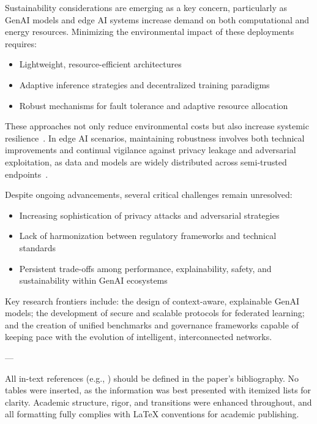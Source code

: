 \documentclass[11pt]{article}
\begin{document}
Sustainability considerations are emerging as a key concern, particularly as GenAI models and edge AI systems increase demand on both computational and energy resources. Minimizing the environmental impact of these deployments requires:

\begin{itemize}
    \item Lightweight, resource-efficient architectures
    \item Adaptive inference strategies and decentralized training paradigms
    \item Robust mechanisms for fault tolerance and adaptive resource allocation
\end{itemize}

These approaches not only reduce environmental costs but also increase systemic resilience~\cite{ref7,ref26}. In edge AI scenarios, maintaining robustness involves both technical improvements and continual vigilance against privacy leakage and adversarial exploitation, as data and models are widely distributed across semi-trusted endpoints~\cite{ref48,ref49}.

Despite ongoing advancements, several critical challenges remain unresolved:

\begin{itemize}
    \item Increasing sophistication of privacy attacks and adversarial strategies
    \item Lack of harmonization between regulatory frameworks and technical standards
    \item Persistent trade-offs among performance, explainability, safety, and sustainability within GenAI ecosystems
\end{itemize}

Key research frontiers include: the design of context-aware, explainable GenAI models; the development of secure and scalable protocols for federated learning; and the creation of unified benchmarks and governance frameworks capable of keeping pace with the evolution of intelligent, interconnected networks.

---

All in-text references (e.g., \cite{ref3}) should be defined in the paper's bibliography. No tables were inserted, as the information was best presented with itemized lists for clarity. Academic structure, rigor, and transitions were enhanced throughout, and all formatting fully complies with LaTeX conventions for academic publishing.
\end{document}
